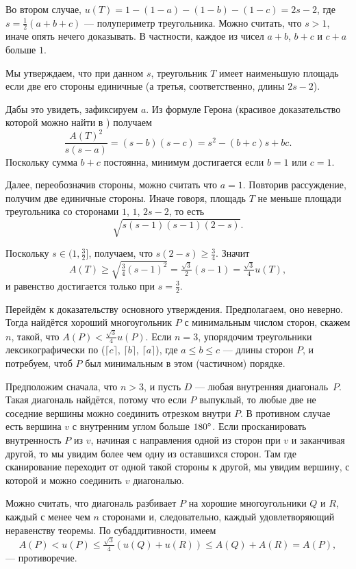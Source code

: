 Во втором случае,
$u(T)=1-(1-a)-(1-b)-(1-c)=2s-2$, где $s=\tfrac12(a+b+c)$ --- полупериметр треугольника.
Можно считать, что $s > 1$, иначе опять нечего доказывать.
В частности, каждое из чисел $a+b$, $b+c$ и $c+a$ больше $1$.

Мы утверждаем, что при данном $s$, треугольник $T$ имеет наименьшую площадь если две его стороны единичные (а третья, соответственно, длины $2s - 2$).

Дабы это увидеть, зафиксируем $a$. 
Из формуле Герона (красивое доказательство которой можно найти в \cite{39}) получаем
\[\frac{A(T)^2}{s(s-a)}=(s-b)(s-c)=s^2-(b+c)s+bc.\]
Поскольку сумма $b + c$ постоянна, минимум достигается если $b = 1$ или $c = 1$.

Далее, переобозначив стороны, можно считать что $a = 1$.
Повторив рассуждение, получим две единичные стороны.
Иначе говоря, площадь $T$ не меньше площади треугольника со сторонами $1$, $1$, $2s - 2$, то есть \[\sqrt{s(s-1)(s-1)(2-s)}.\]

Поскольку $s\in(1,\tfrac32]$, получаем, что $s(2-s)\geqslant \tfrac34$.
Значит 
\[A(T)\ge \sqrt{\tfrac34(s-1)^2}=\tfrac{\sqrt{3}}2(s-1)=\tfrac{\sqrt{3}}4u(T),\]
и равенство достигается только при $s=\tfrac32$.

Перейдём к доказательству основного утверждения.
Предполагаем, оно неверно.
Тогда найдётся хороший многоугольник $P$ с минимальным числом сторон, скажем $n$, такой, что $A(P)<\tfrac{\sqrt{3}}4 u(P)$.
Если $n=3$, упорядочим треугольники лексикографически по ($\lceil c\rceil$, $\lceil b\rceil$, $\lceil a\rceil$), где 
$a\leqslant b\leqslant c$ --- длины сторон $P$, и потребуем, чтоб $P$ был минимальным в этом (частичном) порядке.

Предположим сначала, что $n>3$, и пусть $D$ --- любая внутренняя диагональ~$P$.
Такая диагональ найдётся, потому что если $P$ выпуклый, то любые две не соседние вершины можно соединить отрезком внутри $P$.
В противном случае есть вершина $v$ с внутренним углом больше $180\degree$.
Если просканировать внутренность $P$ из $v$, начиная с направления одной из сторон при $v$ и заканчивая другой,
то мы увидим более чем одну из оставшихся сторон.
Там где сканирование переходит от одной такой стороны к другой, мы увидим вершину, с которой и можно соединить $v$ диагональю.

Можно считать, что диагональ разбивает $P$ на хорошие многоугольники $Q$ и $R$, каждый с менее чем $n$ сторонами и, следовательно, каждый удовлетворяющий неравенству теоремы.
По субаддитивности, имеем
\[A(P)<u(P)\leqslant \tfrac{\sqrt{3}}4(u(Q)+u(R))\leqslant A(Q)+A(R)=A(P),\]
--- противоречие.

